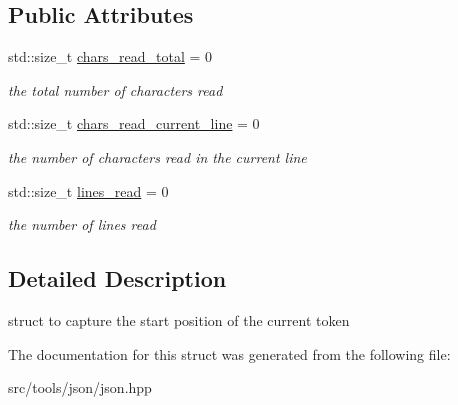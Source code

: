 \subsection*{Public Attributes}
\begin{DoxyCompactItemize}
\item 
\mbox{\label{structnlohmann_1_1detail_1_1position__t_a94cf85cd91d478c20ae143eba906ea1a}} 
std\+::size\+\_\+t \hyperlink{structnlohmann_1_1detail_1_1position__t_a94cf85cd91d478c20ae143eba906ea1a}{chars\+\_\+read\+\_\+total} = 0
\begin{DoxyCompactList}\small\item\em the total number of characters read \end{DoxyCompactList}\item 
\mbox{\label{structnlohmann_1_1detail_1_1position__t_a74df94563dd32102152ceb8c6d9041d8}} 
std\+::size\+\_\+t \hyperlink{structnlohmann_1_1detail_1_1position__t_a74df94563dd32102152ceb8c6d9041d8}{chars\+\_\+read\+\_\+current\+\_\+line} = 0
\begin{DoxyCompactList}\small\item\em the number of characters read in the current line \end{DoxyCompactList}\item 
\mbox{\label{structnlohmann_1_1detail_1_1position__t_a4bbad8bc2c0d17c1b61c3ce729908b71}} 
std\+::size\+\_\+t \hyperlink{structnlohmann_1_1detail_1_1position__t_a4bbad8bc2c0d17c1b61c3ce729908b71}{lines\+\_\+read} = 0
\begin{DoxyCompactList}\small\item\em the number of lines read \end{DoxyCompactList}\end{DoxyCompactItemize}


\subsection{Detailed Description}
struct to capture the start position of the current token 

The documentation for this struct was generated from the following file\+:\begin{DoxyCompactItemize}
\item 
src/tools/json/json.\+hpp\end{DoxyCompactItemize}
